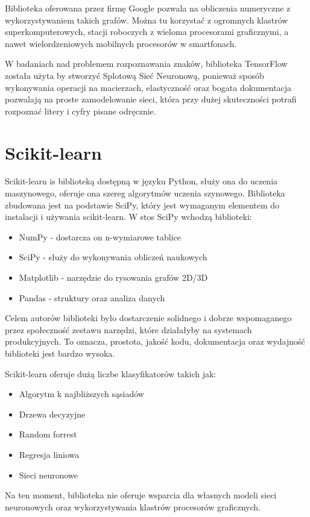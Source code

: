 \documentclass[brudnopis]{xmgr}
\begin{document}
Biblioteka oferowana przez firmę Google pozwala na obliczenia numeryczne z wykorzystywaniem takich grafów. Można tu korzystać z ogromnych klastrów superkomputerowych, stacji roboczych z wieloma procesorami graficznymi, a nawet wielordzeniowych mobilnych procesorów w smartfonach.

W badaniach nad problemem rozpoznawania znaków, biblioteka TensorFlow została użyta by stworzyć Splotową  Sieć Neuronową, ponieważ sposób wykonywania operacji na macierzach, elastyczność oraz bogata dokumentacja pozwalają na proste zamodelowanie sieci, która przy dużej skuteczności potrafi rozpoznać litery i cyfry pisane odręcznie.

\section{Scikit-learn}

Scikit-learn is biblioteką dostępną w języku Python, służy ona do uczenia maszynowego, oferuje ona szereg algorytmów uczenia szynowego. Biblioteka zbudowana jest na podstawie SciPy, który jest wymaganym elementem do instalacji i używania scikit-learn. W stos SciPy wchodzą biblioteki:

\begin{itemize}
\item
NumPy - dostarcza on n-wymiarowe tablice
\item
SciPy - służy do wykonywania obliczeń naukowych
\item
Matplotlib - narzędzie do rysowania grafów 2D/3D
\item
Pandas - struktury oraz analiza danych
\end{itemize}

Celem autorów biblioteki było dostarczenie solidnego i dobrze wspomaganego przez społeczność zestawu narzędzi, które działałyby na systemach produkcyjnych. To oznacza,  prostota, jakość kodu, dokumentacja oraz wydajność biblioteki jest bardzo wysoka.

Scikit-learn oferuje dużą liczbe klasyfikatorów takich jak:
\begin{itemize}
\item
Algorytm k najbliższych sąsiadów
\item
Drzewa decyzyjne
\item
Random forrest
\item
Regresja liniowa
\item
Sieci neuronowe
\end{itemize}

Na ten moment, biblioteka nie oferuje wsparcia dla własnych modeli sieci neuronowych oraz wykorzystywania klastrów procesorów graficznych.
\end{document}
